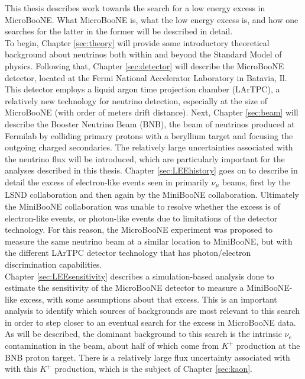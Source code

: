 This thesis describes work towards the search for a low energy excess in MicroBooNE. What MicroBooNE is, what the low energy excess is, and how one searches for the latter in the former will be described in detail.\\

To begin, Chapter \ref{sec:theory} will provide some introductory theoretical background about neutrinos both within and beyond the Standard Model of physics. Following that, Chapter \ref{sec:detector} will describe the MicroBooNE detector, located at the Fermi National Accelerator Laboratory in Batavia, Il. This detector employs a liquid argon time projection chamber (LArTPC), a relatively new technology for neutrino detection, especially at the size of MicroBooNE (with order of meters drift distance). Next, Chapter \ref{sec:beam} will describe the Booster Neutrino Beam (BNB), the beam of neutrinos produced at Fermilab by colliding primary protons with a beryllium target and focusing the outgoing charged secondaries. The relatively large uncertainties associated with the neutrino flux will be introduced, which are particularly important for the analyses described in this thesis. Chapter \ref{sec:LEEhistory} goes on to describe in detail the excess of electron-like events seen in primarily $\nu_\mu$ beams, first by the LSND collaboration and then again by the MiniBooNE collaboration. Ultimately the MiniBooNE collaboration was unable to resolve whether the excess is of electron-like events, or photon-like events due to limitations of the detector technology. For this reason, the MicroBooNE experiment was proposed to measure the same neutrino beam at a similar location to MiniBooNE, but with the different LArTPC detector technology that has photon/electron discrimination capabilities.\\

Chapter \ref{sec:LEEsensitivity} describes a simulation-based analysis done to estimate the sensitivity of the MicroBooNE detector to measure a MiniBooNE-like excess, with some assumptions about that excess. This is an important analysis to identify which sources of backgrounds are most relevant to this search in order to step closer to an eventual search for the excess in MicroBooNE data. As will be described, the dominant background to this search is the intrinsic $\nu_e$ contamination in the beam, about half of which come from $K^+$ production at the BNB proton target. There is a relatively large flux uncertainty associated with with this $K^+$ production, which is the subject of Chapter \ref{sec:kaon}.\\


